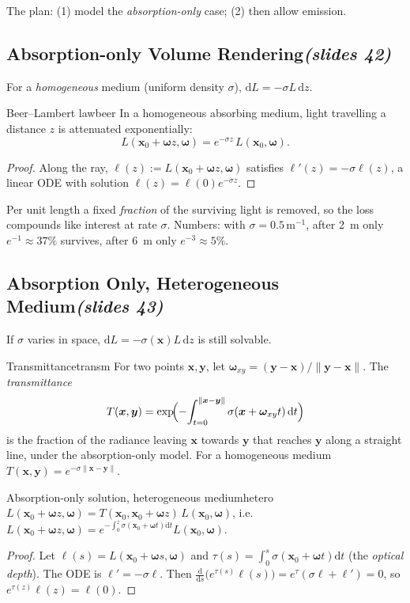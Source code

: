 \documentclass[11pt,a4paper]{article}
\newcommand{\slides}[1]{\texorpdfstring{\hfill{\normalfont\small\emph{(slides #1)}}}{ (slides #1)}}
\newcommand{\x}{\bm{x}}
\newcommand{\y}{\bm{y}}
\newcommand{\w}{\bm{\omega}}
\newcommand{\dd}{\,\mathrm{d}}
\theoremstyle{remark}\newtheorem*{remark}{Remark}
\begin{document}
The plan: (1) model the \emph{absorption-only} case; (2) then allow emission.

\subsection{Absorption-only Volume Rendering\slides{42}}

For a \emph{homogeneous} medium (uniform density $\sigma$), $\mathrm dL=-\sigma L\,\mathrm dz$.

\begin{proposition}{Beer--Lambert law}{beer}
In a homogeneous absorbing medium, light travelling a distance $z$ is attenuated exponentially:
\[
L(\x_0+\w z,\w)=e^{-\sigma z}\,L(\x_0,\w).
\]
\end{proposition}
\begin{proof}
Along the ray, $\ell(z):=L(\x_0+\w z,\w)$ satisfies $\ell'(z)=-\sigma\ell(z)$, a linear ODE with solution $\ell(z)=\ell(0)e^{-\sigma z}$.
\end{proof}

\begin{intuition}
Per unit length a fixed \emph{fraction} of the surviving light is removed, so the loss compounds like interest at rate $\sigma$. Numbers: with $\sigma=0.5\,\mathrm m^{-1}$, after 2~m only $e^{-1}\approx 37\%$ survives, after 6~m only $e^{-3}\approx5\%$.
\end{intuition}

\subsection{Absorption Only, Heterogeneous Medium\slides{43}}

If $\sigma$ varies in space, $\mathrm dL=-\sigma(\x)L\,\mathrm dz$ is still solvable.

\begin{definition}{Transmittance}{transm}
For two points $\x,\y$, let $\w_{xy}=(\y-\x)/\|\y-\x\|$. The \emph{transmittance}
\[
T(\x,\y)=\exp\!\Bigl(-\!\int_{t=0}^{\|\x-\y\|}\sigma(\x+\w_{xy}t)\dd t\Bigr)
\]
is the fraction of the radiance leaving $\x$ towards $\y$ that reaches $\y$ along a straight line, under the absorption-only model. For a homogeneous medium $T(\x,\y)=e^{-\sigma\|\x-\y\|}$.
\end{definition}

\begin{proposition}{Absorption-only solution, heterogeneous medium}{hetero}
$L(\x_0+\w z,\w)=T(\x_0,\x_0+\w z)\,L(\x_0,\w)$, i.e.\ $L(\x_0+\w z,\w)=e^{-\int_0^z\sigma(\x_0+\w t)\mathrm dt}L(\x_0,\w)$.
\end{proposition}
\begin{proof}
Let $\ell(s)=L(\x_0+\w s,\w)$ and $\tau(s)=\int_0^s\sigma(\x_0+\w t)\mathrm dt$ (the \emph{optical depth}). The ODE is $\ell'=-\sigma\ell$. Then $\frac{\mathrm d}{\mathrm ds}\bigl(e^{\tau(s)}\ell(s)\bigr)=e^{\tau}(\sigma\ell+\ell')=0$, so $e^{\tau(z)}\ell(z)=\ell(0)$.
\end{proof}
\end{document}
